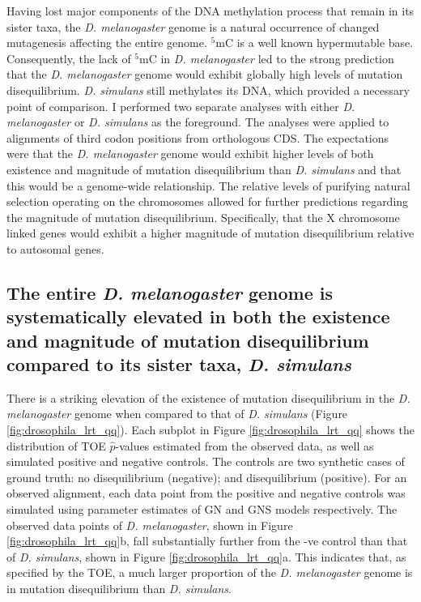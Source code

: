 Having lost major components of the DNA methylation process that remain in its sister taxa, the \textit{D. melanogaster} genome is a natural occurrence of changed mutagenesis affecting the entire genome. $^5$mC is a well known hypermutable base. Consequently, the lack of $^5$mC in
\textit{D. melanogaster} led to the strong prediction that the \textit{D. melanogaster} genome would exhibit globally high levels of mutation disequilibrium. \textit{D. simulans} still methylates its DNA, which provided a necessary point of comparison. I performed two separate analyses with either \textit{D. melanogaster} or \textit{D. simulans} as the foreground. The analyses were applied to alignments of third codon positions from orthologous CDS. The expectations were that the \textit{D. melanogaster} genome would exhibit higher levels of both existence and magnitude of mutation disequilibrium than \textit{D. simulans} and that this would be a genome-wide relationship. The relative levels of purifying natural selection operating on the chromosomes allowed for further predictions regarding the magnitude of mutation disequilibrium. Specifically, that the X chromosome linked genes would exhibit a higher magnitude of mutation disequilibrium relative to autosomal genes. 

\subsection{The entire \textit{D. melanogaster} genome is systematically elevated in both the existence and magnitude of mutation disequilibrium compared to its sister taxa, \textit{D. simulans}}
\label{TOE_drosophila}

There is a striking elevation of the existence of mutation disequilibrium in the \textit{D. melanogaster} genome when compared to that of \textit{D. simulans} (Figure \ref{fig:drosophila_lrt_qq}). Each subplot in Figure \ref{fig:drosophila_lrt_qq} shows the distribution of TOE $\hat p$-values estimated from the observed data, as well as simulated positive and negative controls. The controls are two synthetic cases of ground truth: no disequilibrium (negative); and disequilibrium (positive). For an observed alignment, each data point from the positive and negative controls was simulated using parameter estimates of GN and GNS models respectively. The observed data points of \textit{D. melanogaster}, shown in Figure \ref{fig:drosophila_lrt_qq}b, fall substantially further from the -ve control than that of \textit{D. simulans}, shown in Figure \ref{fig:drosophila_lrt_qq}a. This indicates that, as specified by the TOE, a much larger proportion of the \textit{D. melanogaster} genome is in mutation disequilibrium than \textit{D. simulans}. 

